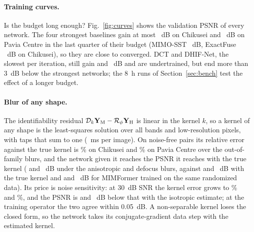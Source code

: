 \documentclass[journal]{IEEEtran}
\begin{document}
\paragraph{Training curves.} Is the budget long enough? Fig.~\ref{fig:curves} shows the validation PSNR of every network. The four strongest baselines gain at most ~dB on Chikusei and ~dB on Pavia Centre in the last quarter of their budget (MIMO-SST ~dB, ExactFuse ~dB on Chikusei), so they are close to converged. DCT and DHIF-Net, the slowest per iteration, still gain  and ~dB and are undertrained, but end more than 3~dB below the strongest networks; the 8~h runs of Section~\ref{sec:bench} test the effect of a longer budget.


\paragraph{Blur of any shape.} The identifiability residual $\mathcal{D}_k\mathbf{Y}_{\mathrm{M}}-\mathcal{R}_\phi\mathbf{Y}_{\mathrm{H}}$ is linear in the kernel $k$, so a kernel of any shape is the least-squares solution over all bands and low-resolution pixels, with taps that sum to one (~ms per image). On noise-free pairs its relative error against the true kernel is \% on Chikusei and \% on Pavia Centre over the out-of-family blurs, and the network given it reaches the PSNR it reaches with the true kernel ( and ~dB under the anisotropic and defocus blurs, against  and ~dB with the true kernel and  and ~dB for MIMFormer trained on the same randomized data). Its price is noise sensitivity: at 30~dB SNR the kernel error grows to \% and \%, and the PSNR is  and ~dB below that with the isotropic estimate; at the training operator the two agree within 0.05~dB. A non-separable kernel loses the closed form, so the network takes its conjugate-gradient data step with the estimated kernel.
\end{document}
